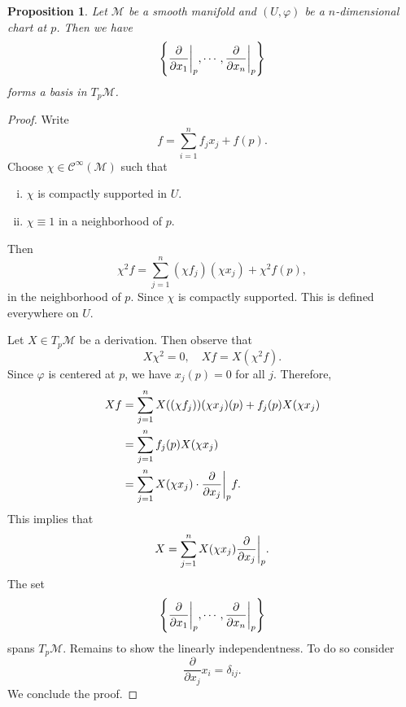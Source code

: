 \documentclass[10pt]{article}
\newtheorem{proposition}{Proposition}[section]
\newcommand{\M}[0]{\mathcal{M}}
\newcommand{\cinf}[0]{\mathcal{C}^\infty}
\begin{document}
\begin{proposition}
  Let $\M$ be a smooth manifold and $(U,\varphi)$ be a $n$-dimensional chart at $p$. Then we have 
  \begin{equation*}
    \left\{{\frac {\partial} {\partial x_1}}\bigg{|}_p,\cdots,{\frac {\partial} {\partial x_n}}\bigg{|}_p\right\}
  \end{equation*}
  forms a basis in $T_p\M$.
\end{proposition}
\begin{proof}
  Write 
  \begin{equation*}
    f = \sum_{i=1}^n f_jx_j+f(p).
  \end{equation*}
  Choose $\chi\in\cinf(\M)$ such that 
  \begin{enumerate}[i).]
    \item $\chi$ is compactly supported in $U$.
    \item $\chi\equiv1$ in a neighborhood of $p$.
  \end{enumerate}
  Then 
  \begin{equation*}
    \chi^2 f = \sum_{j=1}^n (\chi f_j)(\chi x_j)+\chi^2f(p),
  \end{equation*}
  in the neighborhood of $p$. Since $\chi$ is compactly supported. This is defined everywhere on $U$. 
  \par Let $X\in T_p\M$ be a derivation. Then observe that 
  \begin{equation*}
    X\chi^2 = 0,\quad Xf = X(\chi^2f).
  \end{equation*}
  Since $\varphi$ is centered at $p$, we have $x_j(p)=0$ for all $j$. Therefore, 
  \begin{align*}
    Xf &= \sum_{j=1}^n X((\chi f_j))(\chi x_j)(p)+f_j(p)X(\chi x_j)\\
    &= \sum_{j=1}^n f_j(p)X(\chi x_j)\\
    & = \sum_{j=1}^nX(\chi x_j)\cdot{\frac {\partial} {\partial x_j}}\bigg{|}_pf.\\
  \end{align*}
  This implies that 
  \begin{equation*}
    X = \sum_{j=1}^n X(\chi x_j){\frac {\partial } {\partial x_j}}\bigg{|}_p.
  \end{equation*}
  The set 
  \begin{equation*}
    \left\{{\frac {\partial} {\partial x_1}}\bigg{|}_p,\cdots,{\frac {\partial} {\partial x_n}}\bigg{|}_p\right\}
  \end{equation*}
  spans $T_p\M$. Remains to show the linearly independentness. To do so consider 
  \begin{equation*}
    {\frac {\partial} {\partial x_j}}x_i = \delta_{ij}.
  \end{equation*}
  We conclude the proof.
\end{proof}
\end{document}
